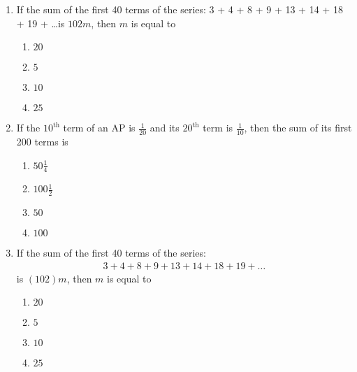 \begin{enumerate}    [label=\thesubsection.\arabic*, ref=\thesubsection.\theenumi]
	\hfill {}
\item If the sum of the first 40 terms of the series: 3 + 4 + 8 + 9 + 13 + 14 + 18 + 19 + \dots is $102m$, then $m$ is equal to
	\hfill {}
		\begin{multicols}{4}
\begin{enumerate}
   \item $20$
   \item $5$
   \item $10$
   \item $25$
\end{enumerate}
                                         \end{multicols} 
					 \item If the $10^{\text{th}}$ term of an  AP  is $\frac{1}{20}$ and its $20^{\text{th}}$ term is $\frac{1}{10}$, then the sum of its first 200 terms is
	\hfill {}
		\begin{multicols}{4}
\begin{enumerate}
    \item $50 \frac{1}{4}$
    \item $100 \frac{1}{2}$
    \item $50$
    \item $100$
\end{enumerate}
                                         \end{multicols} 
\item If the sum of the first 40 terms of the series:\begin{align*}3 + 4 + 8 + 9 + 13 + 14 + 18 + 19 + \dots\end{align*}is $(102)m$, then $m$ is equal to
	\hfill {}
		\begin{multicols}{4}
\begin{enumerate}
   \item $20$
   \item $5$
   \item $10$
   \item $25$
\end{enumerate}
                                         \end{multicols} 
\end{enumerate}
